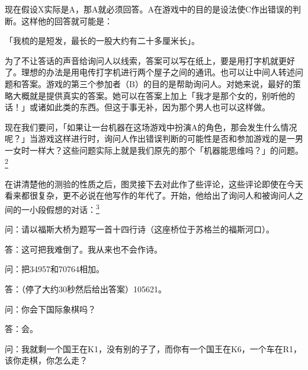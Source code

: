 \documentclass[
  12pt,
  twoside,
  openright,
  oldfontcommands,
]{memoir}
\newenvironment{fsquote}{%
  \begin{mdframed}[style=gebquote]\kaitifamily\small%
}{%
  \end{mdframed}%
}
\begin{document}
\begin{fsquote}
现在假设X实际是A，那A就必须回答。A在游戏中的目的是设法使C作出错误的判断。这样他的回答就可能是：
\end{fsquote}

「我梳的是短发，最长的一股大约有二十多厘米长」。

\begin{fsquote}
为了不让答话的声音给询问人以线索，答案可以写在纸上，要是用打字机就更好了。理想的办法是用电传打字机进行两个屋子之间的通讯。也可以让中间人转述问题和答案。游戏的第三个参加者（B）的目的是帮助询问人。对她来说，最好的策略大概就是提供真实的答案。她可以在答案上加上「我才是那个女的，别听他的话！」或诸如此类的东西。但这于事无补，因为那个男人也可以这样做。
\end{fsquote}

现在我们要问，「如果让一台机器在这场游戏中扮演A的角色，那会发生什么情况呢？」当游戏这样进行时，询问人作出错误判断的可能性是否和参加游戏的是一男一女时一样大？这些问题实际上就是我们原先的那个「机器能思维吗？」的问题。\hyperref[fn:Chapter18-2]{\textsuperscript{2}}

在讲清楚他的测验的性质之后，图灵接下去对此作了些评论，这些评论即使在今天看来都很复杂，更不必说在他写作的年代了。开始，他给出了询问人和被询问人之间的一小段假想的对话：\hyperref[fn:Chapter18-3]{\textsuperscript{3}}

\begin{fsquote}
问：请以福斯大桥为题写一首十四行诗（这座桥位于苏格兰的福斯河口）。
\end{fsquote}

\begin{fsquote}
答：这可把我难倒了。我从来也不会作诗。
\end{fsquote}

\begin{fsquote}
问：把34957和70764相加。
\end{fsquote}

\begin{fsquote}
答：（停了大约30秒然后给出答案）105621。
\end{fsquote}

\begin{fsquote}
问：你会下国际象棋吗？
\end{fsquote}

\begin{fsquote}
答：会。
\end{fsquote}

\begin{fsquote}
问：我就剩一个国王在K1，没有别的子了，而你有一个国王在K6，一个车在R1，该你走棋，你怎么走？
\end{fsquote}
\end{document}
